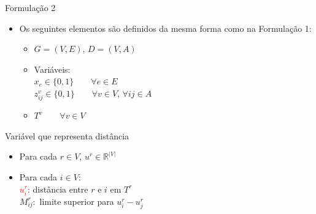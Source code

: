 \documentclass[dvipsnames]{beamer}
\newcommand{\espacoBinary}{\{0,1\}}
\newcommand{\espacoUr}{\mathbb{R}^{|V|}}
\begin{document}
\begin{frame}{Formulação 2}
  \begin{itemize}
  \item Os seguintes elementos são definidos da mesma forma como na Formulação 1:
    \begin{itemize}
    \item <2->$G = (V,E)$, $D = (V,A)$
    \item <3->Variáveis:\\
      $x_e \in \espacoBinary \qquad \forall e \in E$\\
      $z^{v}_{ij} \in \espacoBinary \qquad \forall v \in V,\, \forall ij \in A$
    \item <4->$T^v%
      \qquad \forall v \in V$
      \end{itemize}
    \end{itemize}
  \end{frame}

\begin{frame}{Variável que representa distância
  }
  \hypertarget{var_u}{}
  \begin{itemize}
  \item Para cada $r \in V$, $u^{r} \in \espacoUr$ \\
  \item <2->Para cada $i \in V:$\\
    \textcolor{red}{$u^{r}_{i}$}: distância entre $r$ e $i$ em $T^{r}$\\
    $M_{ij}^{r}:$ limite superior para $u^{r}_{i} - u^{r}_{j}$
  

  
  \end{itemize}
  
\end{frame}
\end{document}
